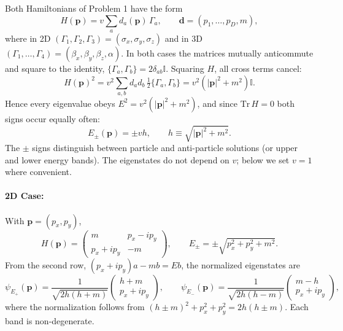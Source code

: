 \documentclass{article}
\begin{document}
    Both Hamiltonians of Problem 1 have the form
    \begin{equation}
        H(\mathbf{p}) = v \sum_{a} d_a(\mathbf{p})\, \Gamma_a, \qquad \mathbf{d} = (p_1,\dots,p_D, m),
    \end{equation}
    where in 2D $(\Gamma_1,\Gamma_2,\Gamma_3) = (\sigma_x,\sigma_y,\sigma_z)$ and in 3D $(\Gamma_1,\dots,\Gamma_4) = (\beta_x,\beta_y,\beta_z,\alpha)$. In both cases the matrices mutually anticommute and square to the identity, $\{\Gamma_a,\Gamma_b\} = 2\delta_{ab}\mathbb{I}$. Squaring $H$, all cross terms cancel:
    \begin{equation}
        H(\mathbf{p})^2 = v^2 \sum_{a,b} d_a d_b\, \tfrac{1}{2}\{\Gamma_a,\Gamma_b\} = v^2\left(|\mathbf{p}|^2 + m^2\right)\mathbb{I}.
    \end{equation}
    Hence every eigenvalue obeys $E^2 = v^2(|\mathbf{p}|^2+m^2)$, and since $\mathrm{Tr}\,H = 0$ both signs occur equally often:
    \begin{equation} \label{eq:general_eigenvalue}
        E_{\pm}(\mathbf{p}) = \pm v h, \qquad h \equiv \sqrt{|\mathbf{p}|^2 + m^2}.
    \end{equation}
    The $\pm$ signs distinguish between particle and anti-particle solutions (or upper and lower energy bands). The eigenstates do not depend on $v$; below we set $v=1$ where convenient.

    \paragraph{2D Case:}
    With $\mathbf{p} = (p_x, p_y)$,
    \begin{equation}
        H(\mathbf{p}) = \begin{pmatrix} m & p_x - i p_y \\ p_x + i p_y & -m \end{pmatrix}, \qquad E_\pm = \pm\sqrt{p_x^2 + p_y^2 + m^2}.
    \end{equation}
    From the second row, $(p_x+ip_y)a - m b = E b$, the normalized eigenstates are
    \begin{equation} \label{eq:2D_states}
        \psi_{E_+} (\mathbf{p}) = \frac{1}{\sqrt{2h(h + m)}}
        \begin{pmatrix}
            h + m \\
            p_x + i p_y
        \end{pmatrix}, \qquad
        \psi_{E_-} (\mathbf{p}) = \frac{1}{\sqrt{2h(h - m)}}
        \begin{pmatrix}
            m - h \\
            p_x + i p_y
        \end{pmatrix},
    \end{equation}
    where the normalization follows from $(h \pm m)^2 + p_x^2 + p_y^2 = 2h(h\pm m)$. Each band is non-degenerate.
\end{document}
